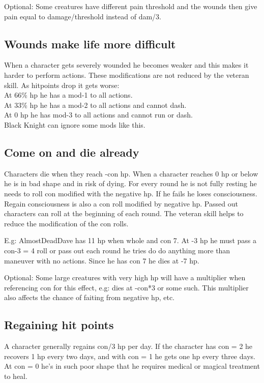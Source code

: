 Optional: Some creatures have different pain threshold and the wounds then give pain equal to damage/threshold instead of dam/3.


\subsection*{Wounds make life more difficult}
When a character gets severely wounded he becomes weaker and this makes it harder to perform actions. These modifications are not reduced by the veteran skill. As hitpoints drop it gets worse:\\
At 66\% hp he has a mod-1 to all actions. \\
At 33\% hp he has a mod-2 to all actions and cannot dash. \\
At 0 hp he has mod-3 to all actions and cannot run or dash.\\
Black Knight can ignore some mods like this.


\subsection*{Come on and die already}
Characters die when they reach -con hp. When a character reaches 0 hp or below he is in bad shape and in risk of dying. For every round he is not fully resting he needs to roll con modified with the negative hp. If he fails he loses consciousness. Regain consciousness is also a con roll modified by negative hp. Passed out characters can roll at the beginning of each round. The veteran skill helps to reduce the modification of the con rolls.

E.g: AlmostDeadDave has 11 hp when whole and con 7. At -3 hp he must pass a con-3 = 4 roll or pass out each round he tries do do anything more than maneuver with no actions. Since he has con 7 he dies at -7 hp.

Optional: Some large creatures with very high hp will have a multiplier when referencing con for this effect, e.g: dies at -con*3 or some such. This multiplier also affects the chance of faiting from negative hp, etc.


\subsection*{Regaining hit points}
A character generally regains con/3 hp per day. If the character has con = 2 he recovers 1 hp every two days, and with con = 1 he gets one hp every three days. At con = 0 he's in such poor shape that he requires medical or magical treatment to heal.

